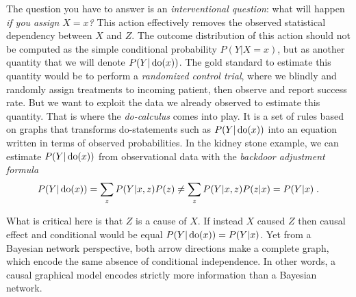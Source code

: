 %    

The question you have to answer is an \textit{interventional question}: what will happen \textit{if you assign $X=x$?} This action effectively removes the observed statistical dependency between $X$ and $Z$. The outcome distribution of this action should not be computed as the simple conditional probability $P(Y|X=x)$, but as another quantity that we will denote $P(Y| \operatorname{\mathrm{do}}(x))$. The gold standard to estimate this quantity would be to perform a \textit{randomized control trial}, where we blindly and randomly assign treatments to incoming patient, then observe and report success rate. But we want to exploit the data we already observed to estimate this quantity. That is where the \textit{do-calculus} comes into play. It is a set of rules based on graphs that transforms do-statements such as $P(Y| \operatorname{\mathrm{do}}(x))$ into an equation written in terms of observed probabilities. 
In the kidney stone example, we can estimate $P(Y| \operatorname{\mathrm{do}}(x))$ from observational data with the \textit{backdoor adjustment formula}
\begin{align}
    P(Y|\operatorname{\mathrm{do}}(x)) = \sum_z P(Y | x, z) P(z) 
    \neq \sum_z P(Y | x, z) P(z|x) = P(Y | x) \; .
    \label{eq:backdoor_adjustment}
\end{align}

What is critical here is that $Z$ is a cause of $X$. If instead $X$ caused $Z$ then causal effect and conditional would be equal $P(Y|\operatorname{\mathrm{do}}(x)) = P(Y | x)$. Yet from a Bayesian network perspective, both arrow directions make a complete graph, which encode the same absence of conditional independence. In other words, a causal graphical model encodes strictly more information than a Bayesian network.

